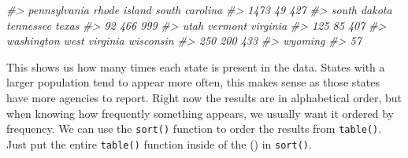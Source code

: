 \documentclass[
  12pt,
]{book}
\newenvironment{Shaded}{\begin{snugshade}}{\end{snugshade}}
\newcommand{\CommentTok}[1]{\textcolor[rgb]{0.37,0.37,0.37}{\textit{#1}}}
\begin{document}
\begin{Shaded}
\begin{Highlighting}[]
\CommentTok{\#\textgreater{}         pennsylvania         rhode island       south carolina }
\CommentTok{\#\textgreater{}                 1473                   49                  427 }
\CommentTok{\#\textgreater{}         south dakota            tennessee                texas }
\CommentTok{\#\textgreater{}                   92                  466                  999 }
\CommentTok{\#\textgreater{}                 utah              vermont             virginia }
\CommentTok{\#\textgreater{}                  125                   85                  407 }
\CommentTok{\#\textgreater{}           washington        west virginia            wisconsin }
\CommentTok{\#\textgreater{}                  250                  200                  433 }
\CommentTok{\#\textgreater{}              wyoming }
\CommentTok{\#\textgreater{}                   57}
\end{Highlighting}
\end{Shaded}

This shows us how many times each state is present in the data. States with a larger population tend to appear more often, this makes sense as those states have more agencies to report. Right now the results are in alphabetical order, but when knowing how frequently something appears, we usually want it ordered by frequency. We can use the \texttt{sort()} function to order the results from \texttt{table()}. Just put the entire \texttt{table()} function inside of the () in \texttt{sort()}.
\end{document}
